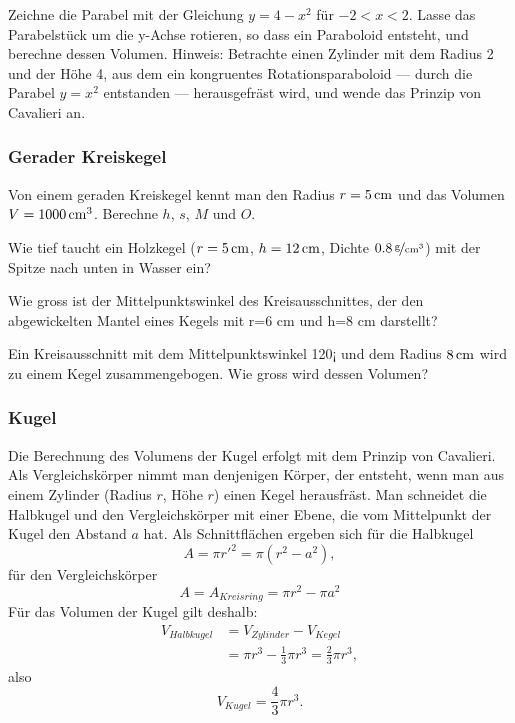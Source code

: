 \documentclass[%
11pt,%
twoside,%
titlepage,%
a4page,%
german,%
headsepline%
]{scrartcl}
\begin{document}
\begin{ueb}
Zeichne die Parabel mit der Gleichung $y=4-x^2$ f\"ur $-2<x<2$. Lasse das Parabelst\"uck um die y-Achse rotieren, so dass ein Paraboloid entsteht, und berechne dessen Volumen. Hinweis: Betrachte einen Zylinder mit dem Radius 2 und der H\"ohe 4, aus dem ein kongruentes Rotationsparaboloid --- durch die Parabel $y=x^2$ entstanden --- herausgefr\"ast wird, und wende das Prinzip von Cavalieri an.
\end{ueb}

\subsubsection{Gerader Kreiskegel}
\begin{ueb}
Von einem geraden Kreiskegel kennt man den Radius $r=\unit[5]{cm}$ und das Volumen $V=\unit[1000]{cm^3}$. Berechne $h$, $s$, $M$ und $O$.
\end{ueb}

\begin{ueb}
Wie tief taucht ein Holzkegel ($r=\unit[5]{cm}$, $h=\unit[12]{cm}$, Dichte $\unitfrac[0.8]{g}{cm^3}$) mit der Spitze nach unten in Wasser ein?
\end{ueb}

\begin{ueb}
Wie gross ist der Mittelpunktswinkel des Kreisausschnittes, der den abgewickelten Mantel eines Kegels mit r=6 cm und h=8 cm darstellt?
\end{ueb}

\begin{ueb}
Ein Kreisausschnitt mit dem Mittelpunktswinkel 120¡ und dem Radius $\unit[8]{cm}$ wird zu einem Kegel zusammengebogen. Wie gross wird dessen Volumen?
\end{ueb}

\subsubsection{Kugel}
Die Berechnung des Volumens der Kugel erfolgt mit dem Prinzip von Cavalieri. Als Vergleichsk\"orper nimmt man denjenigen K\"orper, der entsteht, wenn man aus einem Zylinder (Radius $r$, H\"ohe $r$) einen Kegel herausfr\"ast.
Man schneidet die Halbkugel und den Vergleichsk\"orper mit einer Ebene, die vom Mittelpunkt der Kugel den Abstand $a$ hat. Als Schnittfl\"achen ergeben sich
f\"ur die Halbkugel
$$A = \pi r'^2 =\pi(r^2 - a^2),$$
f\"ur den Vergleichsk\"orper
$$A =A_{Kreisring} =\pi r^2-\pi a^2$$
F\"ur das Volumen der Kugel gilt deshalb:
\begin{align*}
V_{Halbkugel}&=V_{Zylinder}-V_{Kegel}\\
&=\pi r^3-\frac{1}{3}\pi r^3=\frac{2}{3}\pi r^3,
\end{align*}
also
$$V_{Kugel}=\frac{4}{3}\pi r^3.$$
\end{document}
